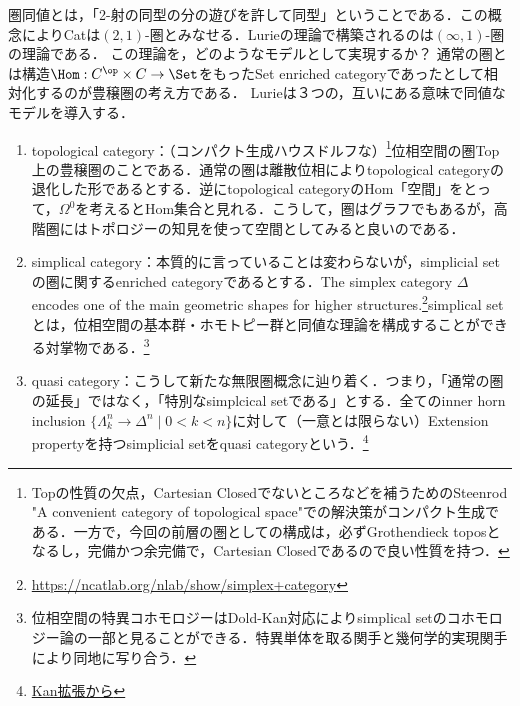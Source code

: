 \documentclass[uplatex,dvipdfmx]{jsreport}
\begin{document}
\begin{tcolorbox}[colframe=ForestGreen, colback=ForestGreen!10!white, breakable ,colbacktitle=ForestGreen!40!white, coltitle=black,fonttitle=\bfseries\sffamily,
    title=]
    圏同値とは，「2-射の同型の分の遊びを許して同型」ということである．この概念によりCatは$(2,1)$-圏とみなせる．Lurieの理論で構築されるのは$(\infty,1)$-圏の理論である．
    この理論を，どのようなモデルとして実現するか？
    通常の圏とは構造$\Hom:C^\op\times C\to\Set$をもったSet enriched categoryであったとして相対化するのが豊穣圏の考え方である．
    Lurieは３つの，互いにある意味で同値なモデルを導入する．
    \begin{enumerate}
        \item topological category：（コンパクト生成ハウスドルフな）\footnote{Topの性質の欠点，Cartesian Closedでないところなどを補うためのSteenrod "A convenient category of topological space"での解決策がコンパクト生成である．一方で，今回の前層の圏としての構成は，必ずGrothendieck toposとなるし，完備かつ余完備で，Cartesian Closedであるので良い性質を持つ．}位相空間の圏Top上の豊穣圏のことである．通常の圏は離散位相によりtopological categoryの退化した形であるとする．逆にtopological categoryのHom「空間」をとって，$\Omega^0$を考えるとHom集合と見れる．こうして，圏はグラフでもあるが，高階圏にはトポロジーの知見を使って空間としてみると良いのである．
        \item simplical category：本質的に言っていることは変わらないが，simplicial setの圏に関するenriched categoryであるとする．The simplex category $\Delta$ encodes one of the main geometric shapes for higher structures.\footnote{\url{https://ncatlab.org/nlab/show/simplex+category}}simplical setとは，位相空間の基本群・ホモトピー群と同値な理論を構成することができる対掌物である．\footnote{位相空間の特異コホモロジーはDold-Kan対応によりsimplical setのコホモロジー論の一部と見ることができる．特異単体を取る関手と幾何学的実現関手により同地に写り合う．}
        \item quasi category：こうして新たな無限圏概念に辿り着く．つまり，「通常の圏の延長」ではなく，「特別なsimplcical setである」とする．全てのinner horn inclusion $\{\Lambda^n_k\to\Delta^n\mid 0<k<n\}$に対して（一意とは限らない）Extension propertyを持つsimplicial setをquasi categoryという．\footnote{\href{https://infinitytopos.wordpress.com/2015/02/05/%
        }{Kan拡張から}}
    \end{enumerate}
\end{tcolorbox}
\end{document}
